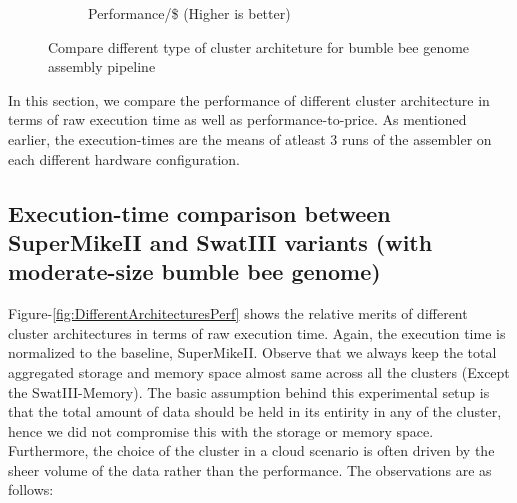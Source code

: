 \documentclass[conference]{IEEEtran}
\begin{document}
\begin{figure}[htb]
\begin{subfigure}[b]{0.5\textwidth}
                \caption{Performance/\$ (Higher is better)}
                \label{fig:DifferentArchitecturesPerfPerDollar}
        \end{subfigure}
        \caption{Compare different type of cluster architeture for bumble bee genome assembly pipeline}
  \label{fig:DifferentArchitectures}
\end{figure}
In this section, we compare the performance of different cluster architecture in terms of raw execution time as well as performance-to-price.
As mentioned earlier, the execution-times are the means of atleast 3 runs of the assembler on each different hardware configuration.
\subsection {Execution-time comparison between SuperMikeII and SwatIII variants (with moderate-size bumble bee genome)} \label{ExecutionTimeDiffArchBumblebee}
Figure-\ref{fig:DifferentArchitecturesPerf} shows the relative merits of different cluster architectures in terms of raw execution time. Again, the execution time is normalized to the baseline, SuperMikeII.
Observe that we always keep the total aggregated storage and memory space almost same across all the clusters (Except the SwatIII-Memory).
The basic assumption behind this experimental setup is that the total amount of data should be held in its entirity in any of the cluster, hence we did not compromise this with the storage or memory space. 
Furthermore, the choice of the cluster in a cloud scenario is often driven by the sheer volume of the data rather than the performance.
The observations are as follows:
\end{document}
